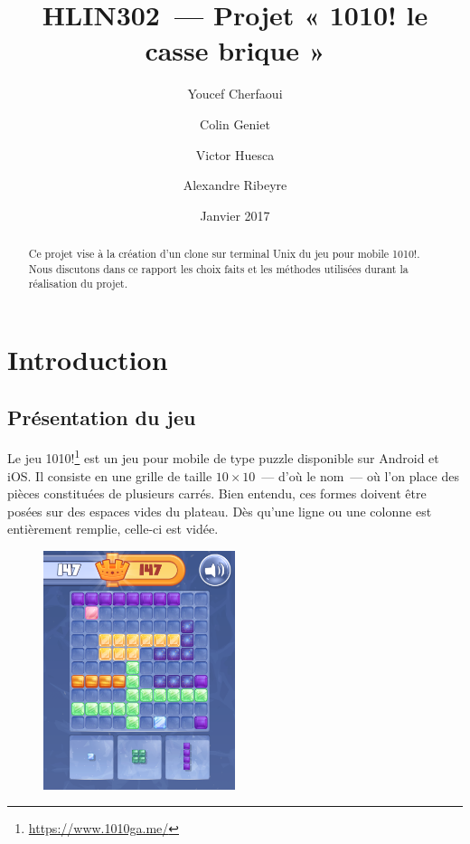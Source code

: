 \documentclass[11pt,a4paper]{article}
\begin{document}
\title{HLIN302~--- Projet « 1010! le casse brique »}
\author{Youcef Cherfaoui
	\and{Colin Geniet}
	\and{Victor Huesca}
	\and{Alexandre Ribeyre}}
\date{Janvier 2017}
\maketitle

\begin{abstract}
Ce projet vise à la création d'un clone sur terminal Unix du jeu pour mobile 1010!. Nous discutons dans ce rapport les choix faits et les méthodes utilisées durant la réalisation du projet.
\end{abstract}

\tableofcontents
\clearpage


\section*{Introduction}
\subsection*{Présentation du jeu}
Le jeu 1010!\footnote{\url{https://www.1010ga.me/}} est un jeu pour mobile de type puzzle disponible sur Android et iOS. Il consiste en une grille de taille $10\times10$~--- d'où le nom~--- où l'on place des pièces constituées de plusieurs carrés. Bien entendu, ces formes doivent être posées sur des espaces vides du plateau. Dès qu'une ligne ou une colonne est entièrement remplie, celle-ci est vidée.

\begin{figure}[h]
\centering
\includegraphics[width=0.5\textwidth]{image/1010_exemple.png}
\end{figure}
\end{document}
